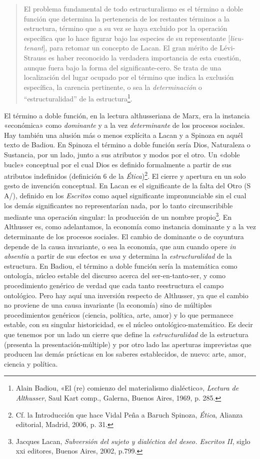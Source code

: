\begin{quote}
El problema fundamental de todo estructuralismo es el término a doble función que determina la pertenencia de los restantes términos a la estructura, término que a su vez se haya excluido por la operación específica que lo hace figurar bajo las especies de su representante {[}\emph{lieu-tenant}{]}, para retomar un concepto de Lacan. El gran mérito de Lévi-Strauss es haber reconocido la verdadera importancia de esta cuestión, aunque fuera bajo la forma del significante-cero. Se trata de una localización del lugar ocupado por el término que indica la exclusión específica, la carencia pertinente, o sea la \emph{determinación} o ``estructuralidad'' de la estructura\footnote{Alain Badiou, «El (re) comienzo del materialismo dialéctico», \emph{Lectura de Althusser}, Saul Kart comp., Galerna, Buenos Aires, 1969, p. 285.}.
\end{quote}

El término a doble función, en la lectura althusseriana de Marx, era la instancia «económica» como \emph{dominante} y a la vez \emph{determinante} de los procesos sociales. Hay también una alusión más o menos explícita a Lacan y a Spinoza en aquél texto de Badiou. En Spinoza el término a doble función sería Dios, Naturaleza o Sustancia, por un lado, junto a sus atributos y modos por el otro. Un «doble bucle» conceptual por el cual Dios es definido formalmente a partir de sus atributos indefinidos (definición 6 de la \emph{Ética})\footnote{Cf. la Introducción que hace Vidal Peña a Baruch Spinoza, \emph{Ética}, Alianza editorial, Madrid, 2006, p. 31.}. El cierre y apertura en un solo gesto de invención conceptual. En Lacan es el significante de la falta del Otro (S A/), definido en los \emph{Escritos} como aquel significante impronunciable sin el cual los demás significantes no representarían nada, por lo tanto circunscribible mediante una operación singular: la producción de un nombre propio\footnote{Jacques Lacan, \emph{Subversión del sujeto y dialéctica del deseo. Escritos II}, siglo xxi editores, Buenos Aires, 2002, p.799.}. En Althusser es, como adelantamos, la economía como instancia dominante y a la vez determinante de los procesos sociales. El cambio de dominante o de coyuntura depende de la causa invariante, o sea la economía, que aun cuando opere \emph{in absentia} a partir de sus efectos es \emph{una} y determina la \emph{estructuralidad} de la estructura. En Badiou, el término a doble función sería la matemática como ontología, núcleo estable del discurso acerca del ser-en-tanto-ser, y como procedimiento genérico de verdad que cada tanto reestructura el campo ontológico. Pero hay aquí una inversión respecto de Althusser, ya que el cambio no proviene de una causa invariante (la economía) sino de múltiples procedimientos genéricos (ciencia, política, arte, amor) y lo que permanece estable, con su singular historicidad, es el núcleo ontológico-matemático. Es decir que tenemos por un lado un cierre que define la \emph{estructuralidad} de la estructura (presenta la presentación-múltiple) y por otro lado las aperturas imprevistas que producen las demás prácticas en los saberes establecidos, de nuevo: arte, amor, ciencia y política.


